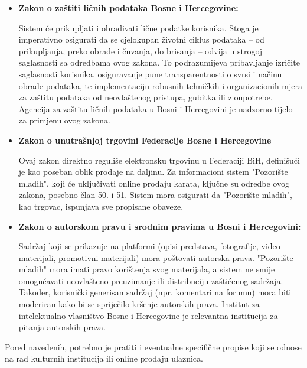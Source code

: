 \begin{itemize}
    \item \textbf{Zakon o zaštiti ličnih podataka Bosne i Hercegovine:}
    
        Sistem će prikupljati i obrađivati lične podatke korisnika. Stoga je imperativno osigurati da se cjelokupan životni ciklus podataka – od prikupljanja, preko obrade i čuvanja, do brisanja – odvija u strogoj saglasnosti sa odredbama ovog zakona. To podrazumijeva pribavljanje izričite saglasnosti korisnika, osiguravanje pune transparentnosti o svrsi i načinu obrade podataka, te implementaciju robusnih tehničkih i organizacionih mjera za zaštitu podataka od neovlaštenog pristupa, gubitka ili zloupotrebe. Agencija za zaštitu ličnih podataka u Bosni i Hercegovini je nadzorno tijelo za primjenu ovog zakona.
        
    \item \textbf{Zakon o unutrašnjoj trgovini Federacije Bosne i Hercegovine}
    
        Ovaj zakon direktno reguliše elektronsku trgovinu u Federaciji BiH, definišući je kao poseban oblik prodaje na daljinu. Za informacioni sistem "Pozorište mladih", koji će uključivati online prodaju karata, ključne su odredbe ovog zakona, posebno član 50. i 51. Sistem mora osigurati da "Pozorište mladih", kao trgovac, ispunjava sve propisane obaveze.
        
    \item \textbf{Zakon o autorskom pravu i srodnim pravima u Bosni i Hercegovini:}
    
        Sadržaj koji se prikazuje na platformi (opisi predstava, fotografije, video materijali, promotivni materijali) mora poštovati autorska prava. "Pozorište mladih" mora imati pravo korištenja svog materijala, a sistem ne smije omogućavati neovlašteno preuzimanje ili distribuciju zaštićenog sadržaja. Također, korisnički generisan sadržaj (npr. komentari na forumu) mora biti moderiran kako bi se spriječilo kršenje autorskih prava. Institut za intelektualno vlasništvo Bosne i Hercegovine je relevantna institucija za pitanja autorskih prava.
\end{itemize}

Pored navedenih, potrebno je pratiti i eventualne specifične propise koji se odnose na rad kulturnih institucija ili online prodaju ulaznica.
